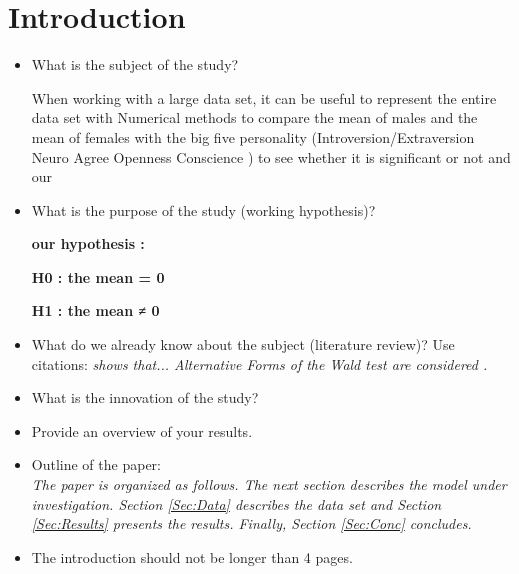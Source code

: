 \section{Introduction}

\begin{itemize}

    \item What is the subject of the study? 

 When working with a large data set, it can be useful to represent the entire data set with Numerical methods to compare the mean of males and the mean of females with the big five personality (Introversion/Extraversion Neuro Agree Openness Conscience ) to see whether it is significant or not and our 
       
                                      
    \item What is the purpose of the study (working hypothesis)?
     
     {\normalsize{\bf  our hypothesis  : }}       
 
 {\normalsize{\bf   H0 :   the mean = 0}}       
                          
 {\normalsize{\bf  H1 :  the mean  ≠ 0}}   

    \item What do we already know about the subject (literature
        review)? Use citations: {\it \citet{Gallant:87} shows that...
        Alternative Forms of the Wald test are considered
        \citep{Breusch&Schmidt:88}.} 
    \item What is the innovation of the study?

    \item Provide an overview of your results.


    \item Outline of the paper:\\
        {\it The paper is organized as follows. The next section describes the
        model under investigation. Section \ref{Sec:Data} describes the data set
        and Section \ref{Sec:Results} presents the results. Finally, Section
        \ref{Sec:Conc} concludes.}

    \item The introduction should not be longer than 4 pages.

\end{itemize}
